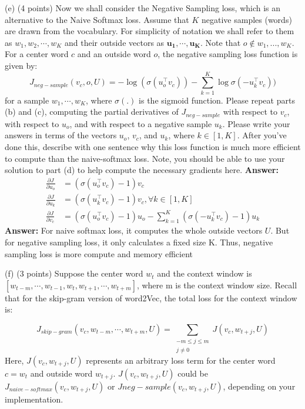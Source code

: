 \documentclass{article}
\begin{document}
\noindent(e)  (4 points) Now we shall consider the Negative Sampling loss, which is an alternative to the Naive Softmax loss. Assume that $K$ negative samples (words) are drawn from the vocabulary. For simplicity of notation we shall refer to them as $w_1, w_2, \cdots,w_K$ and their outside vectors as $\mathbf{u_1},\cdots,\mathbf{u_K}$. Note that $o \not\in {w_1,...,w_K}$.  For a center word $c$ and an outside word $o$, the negative sampling loss function is given by:
$$J_{neg-sample}(v_c, o, U) = -\log (\sigma (u_o^\intercal v_c)) - \sum_{k=1}^{K} \log \sigma(-u_k^\intercal v_c))$$
for a sample $w_1,\cdots,w_K$, where $\sigma(.)$ is the sigmoid function.
\smallbreak
Please repeat parts (b) and (c), computing the partial derivatives of $J_{neg-sample}$ with respect to $v_c$, with respect to $u_o$, and with respect  to a negative sample $u_k$. Please write your answers in terms of the vectors $u_o$, $v_c$, and $u_k$, where $k \in [1, K]$. After you’ve done this, describe with one sentence why this loss function is much more efficient to compute than the naive-softmax loss. Note, you should be able to use your solution to part (d) to help compute the necessary gradients here.
\bigbreak
\noindent
\textbf{Answer:}
\begin{align*}
\frac{\partial J}{\partial u_o} &= (\sigma(u_o^\intercal v_c) - 1)v_c \\
\frac{\partial J}{\partial u_k} &= (\sigma(u_k^\intercal v_c) - 1)v_c, \forall k \in [1, K] \\
\frac{\partial J}{\partial v_c} &=  (\sigma(u_o^\intercal v_c) - 1)u_o - \sum_{k=1}^{K}(\sigma(-u_k^\intercal v_c)-1)u_k
\end{align*}
\textbf{Answer:} For naive softmax loss, it computes the whole outside vectors $U$.  But for negative sampling loss, it only calculates a fixed size K. Thus, negative sampling loss is more compute and memory efficient
\bigbreak

\noindent(f)  (3 points) Suppose the center word $w_t$ and the context window is $[w_{t-m}, \cdots, w_{t-1}, w_t, w_{t+1}, \cdots, w_{t+m}]$, where m is the context window size. Recall that for the skip-gram version of word2Vec, the total loss for the context window is:

\begin{equation}
J_{skip-gram}(v_c, w_{t-m}, \cdots, w_{t+m}, U) = \sum_{\substack{-m \leq j \leq m \\ j\ne 0}} J(v_c, w_{t+j}, U)
\end{equation}
Here, $J(v_c, w_{t+j}, U)$ represents an arbitrary loss term for the center word $c = w_t$ and outside word $w_{t+j}$. $J(v_c, w_{t+j}, U)$ could be $J_{naive-softmax}(v_c, w_{t+j}, U)$ or $J{neg-sample}(v_c, w_{t+j}, U)$, depending on your implementation.
\end{document}
